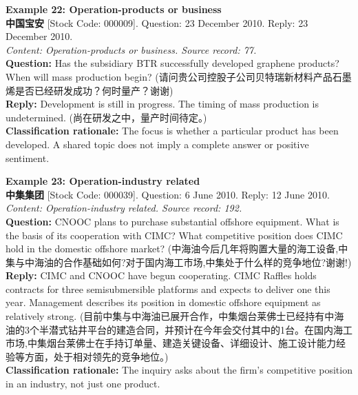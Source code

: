 \clearpage
\noindent \textbf{Example 22: Operation-products or business} \\
\textbf{中国宝安} [Stock Code: 000009]. Question: 23 December 2010. Reply: 23 December 2010. \\
\textit{Content: Operation-products or business. Source record: 77.} \\
\textbf{Question:} Has the subsidiary BTR successfully developed graphene products? When will mass production begin? (请问贵公司控股子公司贝特瑞新材料产品石墨烯是否已经研发成功？何时量产？谢谢) \\
\textbf{Reply:} Development is still in progress. The timing of mass production is undetermined. (尚在研发之中，量产时间待定。) \\
\textbf{Classification rationale:} The focus is whether a particular product has been developed. A shared topic does not imply a complete answer or positive sentiment.

\vspace{0.4cm}
\noindent \textbf{Example 23: Operation-industry related} \\
\textbf{中集集团} [Stock Code: 000039]. Question: 6 June 2010. Reply: 12 June 2010. \\
\textit{Content: Operation-industry related. Source record: 192.} \\
\textbf{Question:} CNOOC plans to purchase substantial offshore equipment. What is the basis of its cooperation with CIMC? What competitive position does CIMC hold in the domestic offshore market? (中海油今后几年将购置大量的海工设备,中集与中海油的合作基础如何?对于国内海工市场,中集处于什么样的竞争地位?谢谢!) \\
\textbf{Reply:} CIMC and CNOOC have begun cooperating. CIMC Raffles holds contracts for three semisubmersible platforms and expects to deliver one this year. Management describes its position in domestic offshore equipment as relatively strong. (目前中集与中海油已展开合作，中集烟台莱佛士已经持有中海油的3个半潜式钻井平台的建造合同，并预计在今年会交付其中的1台。在国内海工市场,中集烟台莱佛士在手持订单量、建造关键设备、详细设计、施工设计能力经验等方面，处于相对领先的竞争地位。) \\
\textbf{Classification rationale:} The inquiry asks about the firm's competitive position in an industry, not just one product.

